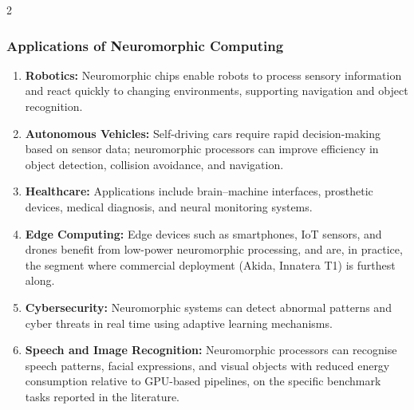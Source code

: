 \begin{multicols}{2}
  \subsubsection*{Applications of Neuromorphic Computing}
  \begin{enumerate}\justifying
    \item \textbf{Robotics:} Neuromorphic chips enable robots to process sensory information and react quickly to changing environments, supporting navigation and object recognition.
    \item \textbf{Autonomous Vehicles:} Self-driving cars require rapid decision-making based on sensor data; neuromorphic processors can improve efficiency in object detection, collision avoidance, and navigation.
    \item \textbf{Healthcare:} Applications include brain–machine interfaces, prosthetic devices, medical diagnosis, and neural monitoring systems.
    \item \textbf{Edge Computing:} Edge devices such as smartphones, IoT sensors, and drones benefit from low-power neuromorphic processing, and are, in practice, the segment where commercial deployment (Akida, Innatera T1) is furthest along.
    \item \textbf{Cybersecurity:} Neuromorphic systems can detect abnormal patterns and cyber threats in real time using adaptive learning mechanisms.
    \item \textbf{Speech and Image Recognition:} Neuromorphic processors can recognise speech patterns, facial expressions, and visual objects with reduced energy consumption relative to GPU-based pipelines, on the specific benchmark tasks reported in the literature.
  \end{enumerate}


\end{multicols}
